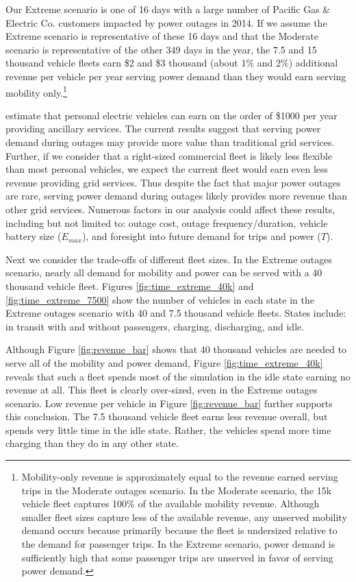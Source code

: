 \documentclass[journal]{IEEEtran}
\begin{document}
Our Extreme scenario is one of 16 days with a large number of Pacific Gas \& Electric Co. customers impacted by power outages in 2014. If we assume the Extreme scenario is representative of these 16 days and that the Moderate scenario is representative of the other 349 days in the year, the 7.5 and 15 thousand vehicle fleets earn \$2 and \$3 thousand (about 1\% and 2\%) additional revenue per vehicle per year serving power demand than they would earn serving mobility only.\footnote{Mobility-only revenue is approximately equal to the revenue earned serving trips in the Moderate outages scenario. In the Moderate scenario, the 15k vehicle fleet captures 100\% of the available mobility revenue. Although smaller fleet sizes capture less of the available revenue, any unserved mobility demand occurs because primarily because the fleet is undersized relative to the demand for passenger trips. In the Extreme scenario, power demand is sufficiently high that some passenger trips are unserved in favor of serving power demand.} 

\cite{sheppard_2016} estimate that personal electric vehicles can earn on the order of \$1000 per year providing ancillary services. The current results suggest that serving power demand during outages may provide more value than traditional grid services. Further, if we consider that a right-sized commercial fleet is likely less flexible than most personal vehicles, we expect the current fleet would earn even less revenue providing grid services. Thus despite the fact that major power outages are rare, serving power demand during outages likely provides more revenue than other grid services. Numerous factors in our analysis could affect these results, including but not limited to: outage cost, outage frequency/duration, vehicle battery size ($E_{max}$), and foresight into future demand for trips and power ($T$).

Next we consider the trade-offs of different fleet sizes. In the Extreme outages scenario, nearly all demand for mobility and power can be served with a 40 thousand vehicle fleet. Figures \ref{fig:time_extreme_40k} and \ref{fig:time_extreme_7500} show the number of vehicles in each state in the Extreme outages scenario with 40 and 7.5 thousand vehicle fleets. States include: in transit with and without passengers, charging, discharging, and idle. 

Although Figure \ref{fig:revenue_bar} shows that 40 thousand vehicles are needed to serve all of the mobility and power demand, Figure \ref{fig:time_extreme_40k} reveals that such a fleet spends most of the simulation in the idle state earning no revenue at all. This fleet is clearly over-sized, even in the Extreme outages scenario. Low revenue per vehicle in Figure \ref{fig:revenue_bar} further supports this conclusion. The 7.5 thousand vehicle fleet earns less revenue overall, but spends very little time in the idle state. Rather, the vehicles spend more time charging than they do in any other state.  
\end{document}

